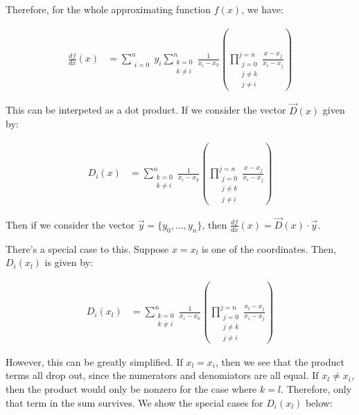 \documentclass{article}
\begin{document}
Therefore, for the whole approximating function $f(x)$, we have:

\begin{align}
\frac{df}{dx}(x) & = \sum_{\begin{matrix}i=0\end{matrix}}^n
	y_i
	\sum_{\begin{matrix}k=0\\k\neq i\end{matrix}}^n
	\frac{1}{x_i - x_k}
	\left( \prod_{
		\begin{matrix} j = 0 \\ j \neq k\\j \neq i \end{matrix}}^{j=n}
		\frac{x - x_j}{x_i - x_j} \right)
\end{align}

This can be interpeted as a dot product.
If we consider the vector $\vec{D}(x)$ given by:

\begin{align}
D_i(x) & = 
	\sum_{\begin{matrix}k=0\\k\neq i\end{matrix}}^n
	\frac{1}{x_i - x_k}
	\left( \prod_{
		\begin{matrix} j = 0 \\ j \neq k\\j \neq i \end{matrix}}^{j=n}
		\frac{x - x_j}{x_i - x_j} \right)
\end{align}

Then if we consider the vector $\vec{y} = \{ y_0, \dots, y_n \}$,
	then $\frac{df}{dx}(x) = \vec{D}(x) \cdot \vec{y}$.

There's a special case to this.  
Suppose $x = x_l$ is one of the coordinates.
Then, $D_i(x_l)$ is given by:

\begin{align}
D_i(x_l) & = 
	\sum_{\begin{matrix}k=0\\k\neq i\end{matrix}}^n
	\frac{1}{x_i - x_k}
	\left( \prod_{
		\begin{matrix} j = 0 \\ j \neq k\\j \neq i \end{matrix}}^{j=n}
		\frac{x_l - x_j}{x_i - x_j} \right)
\end{align}

However, this can be greatly simplified.
If $x_l = x_i$, then we see that the product terms all drop out,
	since the numerators and denomiators are all equal.
If $x_l \neq x_i$, then the product would only be nonzero for the
	case where $k=l$.
Therefore, only that term in the sum survives.
We show the special cases for $D_i(x_l)$ below:
\end{document}
